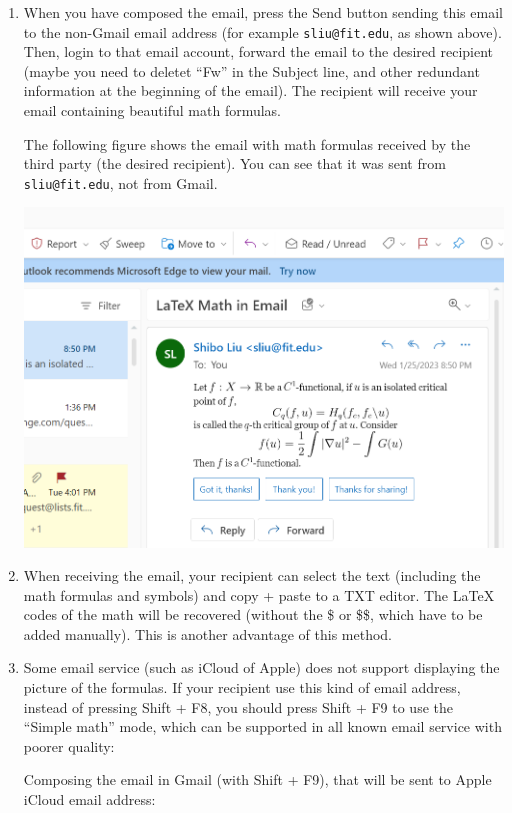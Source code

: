 \documentclass[12pt,landscape]{amsproc}
\begin{document}
\begin{enumerate}
\item When you have composed the email, press the Send button sending this email to the non-Gmail email address (for example \verb|sliu@fit.edu|, as shown above).
Then, login to that email account, forward the email to the desired recipient (maybe you need to deletet ``Fw'' in the Subject line, and other redundant information at the beginning of the email). The recipient will receive your email containing beautiful math formulas.

The following f{}igure shows the email with math formulas received by the third party (the desired recipient). You can see that it was sent from \verb|sliu@fit.edu|, not from Gmail.

\noindent\includegraphics[width=20cm]{em-6}

\item When receiving the email, your recipient can select the text (including the math formulas and symbols) and copy + paste to a TXT editor. The \LaTeX{} codes of the math will be recovered (without the \$ or \$\$, which have to be added manually). This is another advantage of this method.

\item Some email service (such as iCloud of Apple) does not support displaying the picture of the formulas. If your recipient use this kind of email address, instead of pressing Shift + F8, you should press Shift + F9 to use the ``Simple math'' mode, which can be supported in all known email service with poorer quality:

Composing the email in Gmail (with Shift + F9), that will be sent to Apple iCloud email address:


\end{enumerate}
\end{document}
